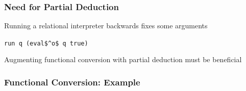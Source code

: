 \documentclass[xcolor=table, aspectratio=169]{beamer}
\newcommand{\backupend}{
   \setcounter{framenumber}{\value{finalframe}}
}
\begin{document}
\begin{frame}[fragile]
  \frametitle{Need for Partial Deduction}

\begin{center}
Running a relational interpreter backwards fixes some arguments
\end{center}

\begin{center}
\begin{minipage}{0.3\textwidth}
  \lstinline{run q (eval$^o$ q true)}
\end{minipage}

\vfill

\begin{center}
  Augmenting functional conversion with partial deduction must be beneficial
\end{center}
\end{center}


\end{frame}
\begin{frame}[fragile]
    \frametitle{Functional Conversion: Example}
    \begin{columns}
        \begin{column}[t]{0.45\textwidth}
            
        \end{column}
        \begin{column}[t]{0.55\textwidth}
            
        \end{column}
    \end{columns}
\end{frame}

\backupend
\end{document}
